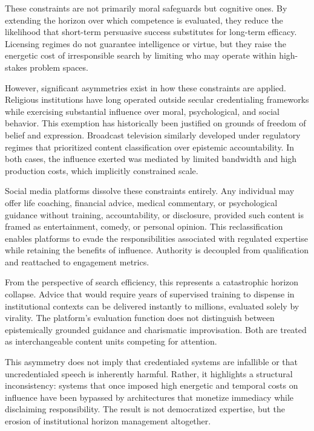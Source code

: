 \documentclass[12pt]{article}
\begin{document}
These constraints are not primarily moral safeguards but cognitive ones. By extending the horizon over which competence is evaluated, they reduce the likelihood that short-term persuasive success substitutes for long-term efficacy. Licensing regimes do not guarantee intelligence or virtue, but they raise the energetic cost of irresponsible search by limiting who may operate within high-stakes problem spaces.

However, significant asymmetries exist in how these constraints are applied. Religious institutions have long operated outside secular credentialing frameworks while exercising substantial influence over moral, psychological, and social behavior. This exemption has historically been justified on grounds of freedom of belief and expression. Broadcast television similarly developed under regulatory regimes that prioritized content classification over epistemic accountability. In both cases, the influence exerted was mediated by limited bandwidth and high production costs, which implicitly constrained scale.

Social media platforms dissolve these constraints entirely. Any individual may offer life coaching, financial advice, medical commentary, or psychological guidance without training, accountability, or disclosure, provided such content is framed as entertainment, comedy, or personal opinion. This reclassification enables platforms to evade the responsibilities associated with regulated expertise while retaining the benefits of influence. Authority is decoupled from qualification and reattached to engagement metrics.

From the perspective of search efficiency, this represents a catastrophic horizon collapse. Advice that would require years of supervised training to dispense in institutional contexts can be delivered instantly to millions, evaluated solely by virality. The platform’s evaluation function does not distinguish between epistemically grounded guidance and charismatic improvisation. Both are treated as interchangeable content units competing for attention.

This asymmetry does not imply that credentialed systems are infallible or that uncredentialed speech is inherently harmful. Rather, it highlights a structural inconsistency: systems that once imposed high energetic and temporal costs on influence have been bypassed by architectures that monetize immediacy while disclaiming responsibility. The result is not democratized expertise, but the erosion of institutional horizon management altogether.
\end{document}
